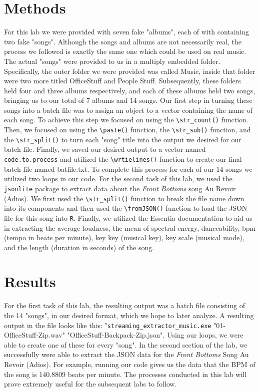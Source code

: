 \documentclass{article}\usepackage[]{graphicx}\usepackage[]{xcolor}
\begin{document}
\begin{multicols}{2}
\section{Methods}
For this lab we were provided with seven fake "albums", each of with containing two fake "songs". Although the songs and albums are not necessarily real, the process we followed is exactly the same one which could be used on real music. The actual "songs" were provided to us in a multiply embedded folder. Specifically, the outer folder we were provided was called Music, inside that folder were two more titled OfficeStuff and People Stuff. Subsequently, these folders held four and three albums respectively, and each of these albums held two songs, bringing us to our total of 7 albums and 14 songs. Our first step in turning these songs into a batch file was to assign an object to a vector containing the name of each song. To achieve this step we focused on using the \verb|\str_count()| function. Then, we focused on using the \verb|\paste()| function, the \verb|\str_sub()| function, and the \verb|\str_split()| to turn each "song" title into the output we desired for our batch file. Finally, we saved our desired output to a vector named \texttt{code.to.process} and utilized the \verb|\wrtielines()| function to create our final batch file named batfile.txt. To complete this process for each of our 14 songs we utilized two loops in our code. For the second task of this lab, we used the \texttt{jsonlite} package to extract data about the \textit{Front Bottoms} song Au Revoir (Adios). We first used the \verb|\str_split()| function to break the file name down into its components and then used the \verb|\fromJSON()| function to load the JSON file for this song into \texttt{R}. Finally, we utilized the Essentia documentation to aid us in extracting the average loudness, the mean of spectral energy, danceability, bpm (tempo in beats per minute), key key (musical key), key scale (musical mode), and the length (duration in seconds) of the song.

\section{Results}
For the first task of this lab, the resulting output was a batch file consisting of the 14 "songs", in our desired format, which we hope to later analyze. A resulting output in the file looks like this: "\texttt{streaming\_extractor\_music.exe} "01-OfficeStuff-Zip.wav" "OfficeStuff-Backpack-Zip.json". Using our loops, we were able to create one of these for every "song". In the second section of the lab, we successfully were able to extract the JSON data for the \textit{Front Bottoms} Song Au Revoir (Adios). For example, running our code gives us the data that the BPM of the song is 140.8809 beats per minute. The processes conducted in this lab will prove extremely useful for the subsequent labs to follow.


\end{multicols}
\end{document}

